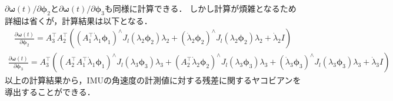 $\partial \boldsymbol \omega(t) / \partial \boldsymbol \phi_{2}$と$\partial \boldsymbol \omega(t) / \partial \boldsymbol \phi_{3}$も同様に計算できる．
しかし計算が煩雑となるため詳細は省くが，計算結果は以下となる．
%
\begin{align}
  \frac{ \partial \boldsymbol \omega(t) }{ \partial \boldsymbol \phi_{2} }
  =
  A_{3}^{\top} A_{2}^{\top}
  \left(
    \left( A_{1}^{\top} \dot{ \lambda }_{1} \boldsymbol \phi_{1} \right)^{\wedge} J_{l} \left( \lambda_{2} \boldsymbol \phi_{2} \right) \lambda_{2}
    + \left( \dot{ \lambda }_{2} \boldsymbol \phi_{2} \right)^{\wedge} J_{l} \left( \lambda_{2} \boldsymbol \phi_{2} \right) \lambda_{2}
    + \dot{ \lambda }_{2} I
  \right)
\end{align}
%
\begin{align}
  \frac{ \partial \boldsymbol \omega(t) }{ \partial \boldsymbol \phi_{3} }
  =
  A_{3}^{\top}
  \left(
    \left( A_{2}^{\top} A_{1}^{\top} \dot{ \lambda }_{1} \boldsymbol \phi_{1} \right)^{\wedge} J_{l} \left( \lambda_{3} \boldsymbol \phi_{3} \right) \lambda_{3}
    + \left( A_{2}^{\top} \dot{ \lambda }_{2} \boldsymbol \phi_{2} \right)^{\wedge} J_{l} \left( \lambda_{3} \boldsymbol \phi_{3} \right) \lambda_{3}
    + \left( \dot{ \lambda }_{3} \boldsymbol \phi_{3} \right)^{\wedge} J_{l} \left( \lambda_{3} \boldsymbol \phi_{3} \right) \lambda_{3}
    + \dot{ \lambda }_{3} I
  \right)
\end{align}
%
以上の計算結果から，IMUの角速度の計測値に対する残差に関するヤコビアンを導出することができる．


